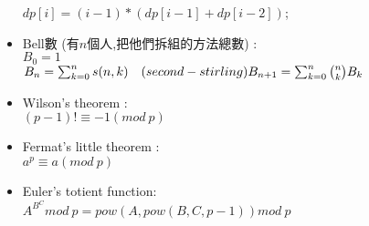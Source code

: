 \begin{itemize}
  $dp[i]=(i-1)*(dp[i-1]+dp[i-2])$;
\item Bell數 (有$n$個人,把他們拆組的方法總數) : \\
  $B_0= 1$\\
  $B_n= \sum_{k=0}^{n} s(n,k)\quad (second-stirling)\\
  B_{n+1}= \sum_{k=0}^{n}{n \choose k} B_k$
\item Wilson's theorem :\\
  $(p-1)! \equiv -1 (mod \ p)$
\item Fermat's little theorem :\\
  $a^p \equiv a (mod \ p)$
\item Euler's totient function:\\
  $ A ^ {B ^ C} mod \ p = pow(A,pow(B,C,p-1)) mod \ p$
\end{itemize}